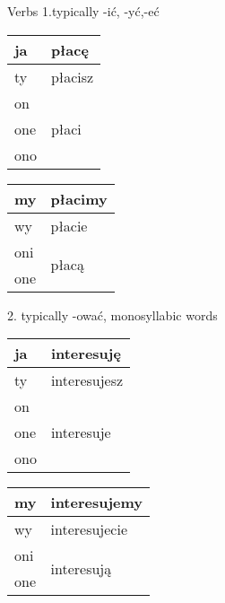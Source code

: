\documentclass[10pt,twoside]{../filofax2}
\begin{document}
\begin{ffpage}{\Huge Verbs}
1.typically -ić, -yć,-eć\\
\begin{tabular}{|m{0.6cm}|m{2.25cm}|}
	\hline
	ja&płacę\\\hline
	ty&płacisz\\\hline
	on&\multirow{3}{*}{płaci}\\
	one&\\
	ono& \\\hline
\end{tabular}
\begin{tabular}{|m{0.6cm}|m{2.25cm}|}
	\hline
	my &płacimy\\\hline
	wy &płacie\\\hline
	oni&\multirow{2}{*}{płacą}\\
	one&\\\hline
\end{tabular}

\vspace{1cm}
2. typically -ować, monosyllabic words\\
\begin{tabular}{|m{0.5cm}|m{2.25cm}|}
	\hline
	ja&interesuję\\\hline
	ty&interesujesz\\\hline
	on& \multirow{3}{*}{interesuje}\\
	one&\\
	ono& \\\hline
\end{tabular}
\begin{tabular}{|m{0.5cm}|m{2.4cm}|}
	\hline
	my &interesujemy\\\hline

	wy &interesujecie\\\hline
	oni &  \multirow{2}{*}{interesuj\k{a}}\\one&\\\hline
\end{tabular}

\vspace{1cm}
\end{ffpage}
\end{document}
